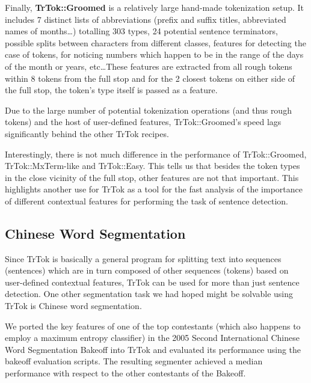 Finally, \textbf{TrTok::Groomed} is a relatively large hand-made
tokenization setup. It includes 7 distinct lists of abbreviations
(prefix and suffix titles, abbreviated names of months\ldots)
totalling 303 types, 24 potential sentence terminators, possible
splits between characters from different classes, features for
detecting the case of tokens, for noticing numbers which happen to be
in the range of the days of the month or years, etc\ldots These
features are extracted from all rough tokens within 8 tokens from the
full stop and for the 2 closest tokens on either side of the full
stop, the token's type itself is passed as a feature.

Due to the large number of potential tokenization operations (and thus
rough tokens) and the host of user-defined features, TrTok::Groomed's
speed lags significantly behind the other TrTok recipes.

Interestingly, there is not much difference in the performance of
TrTok::Groomed, TrTok::MxTerm-like and TrTok::Easy. This tells us that
besides the token types in the close vicinity of the full stop, other
features are not that important. This highlights another use for TrTok
as a tool for the fast analysis of the importance of different
contextual features for performing the task of sentence detection.

\subsection{Chinese Word Segmentation}

Since TrTok is basically a general program for splitting text into
sequences (sentences) which are in turn composed of other sequences
(tokens) based on user-defined contextual features, TrTok can be used
for more than just sentence detection. One other segmentation task we
had hoped might be solvable using TrTok is Chinese word segmentation.

We ported the key features of one of the top contestants (which also
happens to employ a maximum entropy classifier)
\cite{seg-chinese-maxent} in the 2005 Second International Chinese
Word Segmentation Bakeoff into TrTok and evaluated its performance
using the bakeoff evaluation scripts. The resulting segmenter achieved
a median performance with respect to the other contestants of the
Bakeoff.

